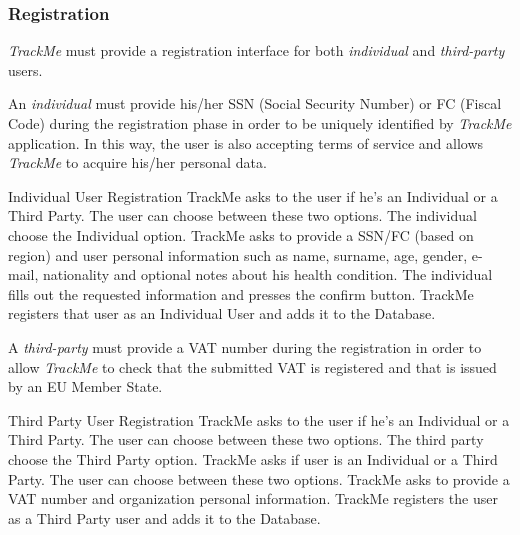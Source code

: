 \documentclass[a4paper]{article}
\begin{document}
        \subsubsection{Registration}
        \textit{TrackMe} must provide a registration interface for both \textit{individual} and \textit{third-party} users.
        
        An \textit{individual} must provide his/her SSN (Social Security Number) or FC (Fiscal Code) during the registration phase in order to be uniquely identified by \textit{TrackMe} application. In this way, the user is also accepting terms of service and allows \textit{TrackMe} to acquire his/her personal data.
        \begin{usecase}{Individual User Registration}
              {TrackMe asks to the user if he's an Individual or a Third Party. The user can choose between these two options.}
              {The individual choose the Individual option.}
              {TrackMe asks to provide a SSN/FC (based on region) and user personal information such as name, surname, age, gender, e-mail, nationality and optional notes about his health condition.}
              {The individual fills out the requested information and presses the confirm button.}
              {TrackMe registers that user as an Individual User and adds it to the  Database.}
        \end{usecase}
        
        A \textit{third-party} must provide a VAT number during the registration in order to allow \textit{TrackMe} to check that the submitted VAT is registered and that is issued by an EU Member State.
        
        \begin{usecase}{Third Party User Registration}
              {TrackMe asks to the user if he's an Individual or a Third Party. The user can choose between these two options.}
              {The third party choose the Third Party option.}
              {TrackMe asks if user is an Individual or a Third Party. The user can choose between these two options.}
              {TrackMe asks to provide a VAT number and organization personal information.}
              {TrackMe registers the user as a Third Party user and adds it to the Database.}
        \end{usecase}
        
\end{document}
